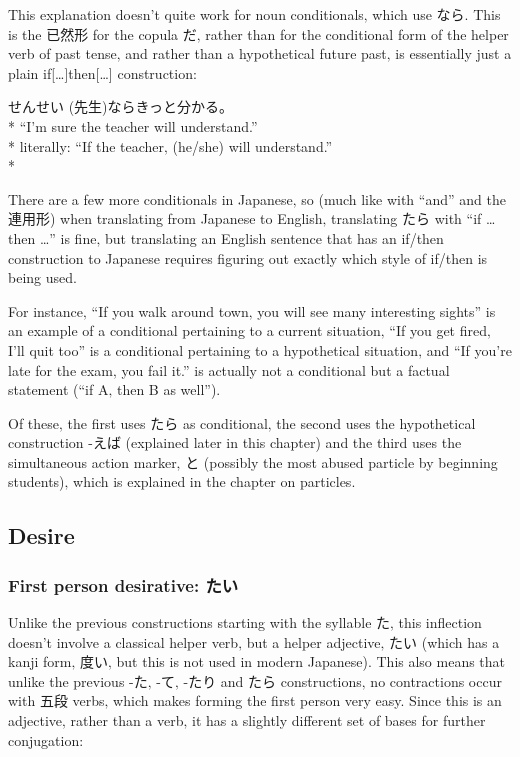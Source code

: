\documentclass[11pt, b5paper, twoside, openright, onecolumn]{book}
\makeatletter
\newcommand*{\rubystack}[2]{{\relscale{0.5}%
  \begin{tabular}[b]{@{}c@{}}%
    {#1}\\%
   {\textscale{2}{#2}}%
  \end{tabular}}%
}
\DeclareRobustCommand*{\ruby}[2]{%
  \mbox{%
    \setlength{\parskip}{0ex}%
    \BeginAccSupp{method=pdfstringdef,ActualText={#1}}%
      \rubystack{\phantom{#2}}{#1}%
      \llap{%
        \rubystack{#2}{\phantom{#1}}%
      }%
    \EndAccSupp{}%
  }%
}
\renewcommand*{\ruby}[2]{#2 (#1)}%
\newenvironment{exampleblock}{
\setlength{\parindent}{0.6in}
\begin{minipage}[t]{\dimexpr\textwidth-\parindent}}
{\end{minipage}}
\makeatother
\begin{document}
This explanation doesn’t quite work for noun conditionals‚ which use なら. This is the 已然形 for the copula だ‚ rather than for the conditional form of the helper verb of past tense‚ and rather than a hypothetical future past‚ is essentially just a plain if[…]then[…] construction:

\vspace{0.4cm}
\begin{exampleblock}
\ruby{先生}{せんせい}ならきっと分かる。 \\* 
“I’m sure the teacher will understand.” \\* 
literally: “If the teacher‚ (he/she) will understand.” \\* 
\end{exampleblock}
\vspace{0.2cm}

There are a few more conditionals in Japanese‚ so (much like with “and” and the 連用形) when translating from Japanese to English‚ translating たら with “if … then …” is fine‚ but translating an English sentence that has an if/then construction to Japanese requires figuring out exactly which style of if/then is being used.

For instance‚ “If you walk around town‚ you will see many interesting sights” is an example of a conditional pertaining to a current situation‚ “If you get fired‚ I’ll quit too” is a conditional pertaining to a hypothetical situation‚ and “If you’re late for the exam‚ you fail it.” is actually not a conditional but a factual statement (“if A‚ then B as well”).

Of these‚ the first uses たら as conditional‚ the second uses the hypothetical construction -えば (explained later in this chapter) and the third uses the simultaneous action marker‚ と (possibly the most abused particle by beginning students)‚ which is explained in the chapter on particles.

\subsection{Desire}

\subsubsection{First person desirative: たい}

Unlike the previous constructions starting with the syllable た‚ this inflection doesn’t involve a classical helper verb‚ but a helper adjective‚ たい (which has a kanji form‚ 度い‚ but this is not used in modern Japanese).  This also means that unlike the previous -た‚ -て‚ -たり and たら constructions‚ no contractions occur with 五段 verbs‚ which makes forming the first person  very easy. Since this is an adjective‚ rather than a verb‚ it has a slightly different set of bases for further conjugation:
\end{document}
